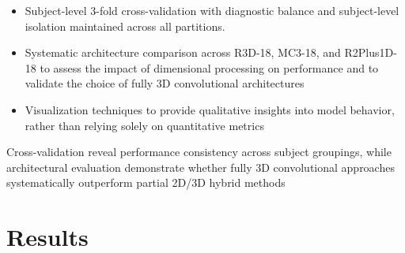 \documentclass[12pt, a4paper]{article}
\begin{document}
\begin{itemize}
    \item Subject-level 3-fold cross-validation with diagnostic balance and subject-level isolation maintained across all partitions.
    
    \item Systematic architecture comparison across R3D-18, MC3-18, and R2Plus1D-18 to assess the impact of dimensional processing on performance and to validate the choice of fully 3D convolutional architectures
    
    \item Visualization techniques to provide qualitative insights into model behavior, rather than relying solely on quantitative metrics
\end{itemize}

Cross-validation reveal performance consistency across subject groupings, while architectural evaluation demonstrate whether fully 3D convolutional approaches systematically outperform partial 2D/3D hybrid methods

\section{Results}









\end{document}
